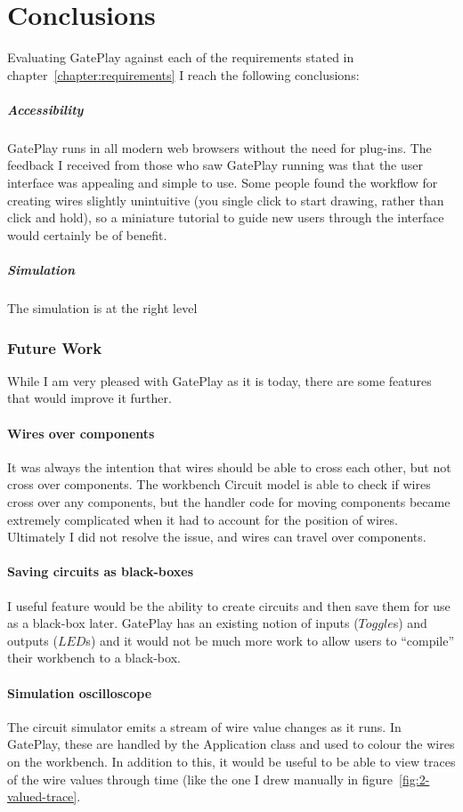 \chapter{Conclusions}
Evaluating GatePlay against each of the requirements stated in chapter~\ref{chapter:requirements} I reach the following conclusions:

\paragraph{Accessibility}
GatePlay runs in all modern web browsers without the need for plug-ins. The feedback I received from those who saw GatePlay running was that the user interface was appealing and simple to use. Some people found the workflow for creating wires slightly unintuitive (you single click to start drawing, rather than click and hold), so a miniature tutorial to guide new users through the interface would certainly be of benefit.

\paragraph{Simulation}
The simulation is at the right level

\subsection{Future Work}
While I am very pleased with GatePlay as it is today, there are some features that would improve it further.

\subsubsection{Wires over components}
It was always the intention that wires should be able to cross each other, but not cross over components. The workbench Circuit model is able to check if wires cross over any components, but the handler code for moving components became extremely complicated when it had to account for the position of wires. Ultimately I did not resolve the issue, and wires can travel over components.

\subsubsection{Saving circuits as black-boxes}
I useful feature would be the ability to create circuits and then save them for use as a black-box later. GatePlay has an existing notion of inputs ($Toggle$s) and outputs ($LED$s) and it would not be much more work to allow users to ``compile'' their workbench to a black-box.

\subsubsection{Simulation oscilloscope}
The circuit simulator emits a stream of wire value changes as it runs. In GatePlay, these are handled by the Application class and used to colour the wires on the workbench. In addition to this, it would be useful to be able to view traces of the wire values through time (like the one I drew manually in figure~\ref{fig:2-valued-trace}.